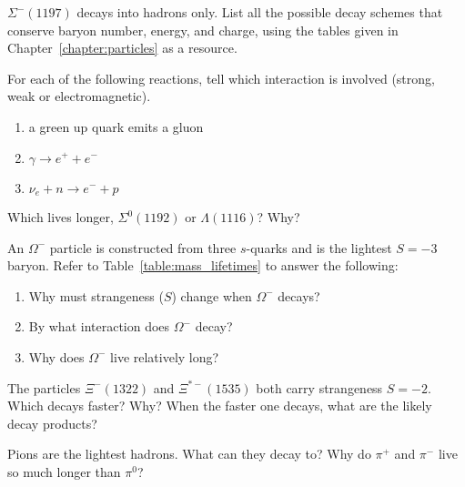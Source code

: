 \begin{problem}
$\Sigma^-(1197)$ decays into hadrons only.  List all the
possible decay schemes that conserve baryon number, energy, and
charge, using the tables given in Chapter~\ref{chapter:particles} as a
resource. 
\label{prob:Sigma_minus_decay}
\end{problem}

\begin{problem}
For each of the following reactions, tell which interaction is
  involved (strong, weak or electromagnetic).
  \begin{enumerate}
  \item a green up quark emits a gluon
  \item $\gamma \to e^+ + e^-$
  \item $\nu_e + n \to e^- + p$
  \end{enumerate}
\label{prob:identify_interaction}
\end{problem}

\begin{problem}
Which lives longer, $\Sigma^0(1192)$ or $\Lambda(1116)$?  Why?
\label{prob:compare_lifetime}
\end{problem}

\begin{problem}
An $\Omega^-$ particle is constructed from three $s$-quarks and
  is the lightest $S = -3$ baryon.  Refer to
  Table~\ref{table:mass_lifetimes} to answer the following:
  \begin{enumerate}
  \item Why must strange\-ness ($S$) change when $\Omega^-$ decays?
  \item By what interaction does $\Omega^-$ decay?
  \item Why does $\Omega^-$ live relatively long?
  \end{enumerate}
\label{prob:Omega_minus}
\end{problem}

\begin{problem}
The particles $\Xi^-(1322)$ and $\Xi^{*-}(1535)$ both carry
strange\-ness $S = -2$.  Which decays faster?  Why?  When the faster
  one decays, what are the likely decay products?
\label{prob:Xi_minus}
\end{problem}

\begin{problem}
Pions are the lightest hadrons.  What can they decay to?  Why do
  $\pi^+$ and $\pi^-$ live so much longer than $\pi^0$?
\label{prob:pion_decay}
\end{problem}

